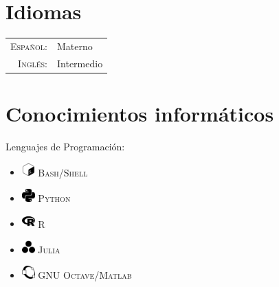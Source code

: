 \documentclass[a4paper,10pt]{article}
\begin{document}
\section{Idiomas}
\vspace{5mm}
\begin{tabular}{rl}
 \textsc{Español:}&Materno\\
 \textsc{Inglés:}&Intermedio\\
\end{tabular}
\vfill
\section{Conocimientos informáticos}
\vspace{5mm}
\begin{minipage}[b]{\textwidth}
\begin{minipage}[b]{0.5 \textwidth}
Lenguajes de Programación:
\begin{itemize}
\item \includegraphics[height=0.5cm, width=0.5cm]{img/gnubash.png}  \textsc {Bash/Shell}
\item \includegraphics[height=0.5cm, width=0.5cm]{img/python.png} \textsc {Python}
\item \includegraphics[height=0.5cm, width=0.5cm]{img/r.png} \textsc {R}
\item \includegraphics[height=0.5cm, width=0.5cm]{img/julia.png} \textsc {Julia}
\item \includegraphics[height=0.5cm, width=0.5cm]{img/octave.png} \textsc {GNU Octave/Matlab}


\end{itemize}
\end{minipage}
\end{minipage}
\end{document}

